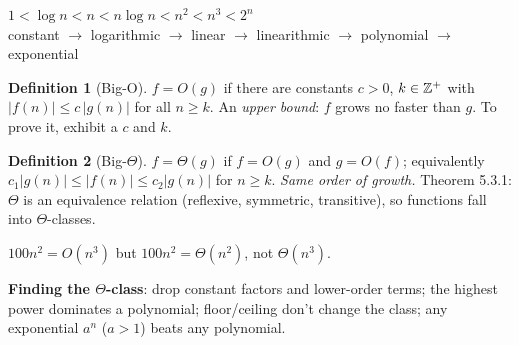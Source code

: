 \documentclass{fkt-notes}
\theoremstyle{definition}
\newtheorem*{defn}{Definition}
\begin{document}
\begin{rulebox}[title={Growth order (slowest to fastest, for large $n$)}]
  \centering
  $1<\log n<n<n\log n<n^2<n^3<2^n$\\
  constant $\to$ logarithmic $\to$ linear $\to$ linearithmic $\to$ polynomial
  $\to$ exponential
\end{rulebox}

\begin{defn}[Big-O]
  $f=O(g)$ if there are constants $c>0$, $k\in\mathbb{Z}^+$ with
  $|f(n)|\le c\,|g(n)|$ for all $n\ge k$. An \emph{upper bound}: $f$ grows
  no faster than $g$. To prove it, exhibit a $c$ and $k$.
\end{defn}
\begin{defn}[Big-$\Theta$]
  $f=\Theta(g)$ if $f=O(g)$ and $g=O(f)$; equivalently
  $c_1|g(n)|\le|f(n)|\le c_2|g(n)|$ for $n\ge k$. \emph{Same order of
    growth.} Theorem 5.3.1: $\Theta$ is an equivalence relation (reflexive,
  symmetric, transitive), so functions fall into $\Theta$-classes.
\end{defn}

$100n^2=O(n^3)$ but $100n^2=\Theta(n^2)$, not $\Theta(n^3)$.

\begin{rulepar}
  \textbf{Finding the $\Theta$-class}: drop constant factors and lower-order
  terms; the highest power dominates a polynomial; floor/ceiling don't
  change the class; any exponential $a^n$ ($a>1$) beats any polynomial.
\end{rulepar}
\end{document}
